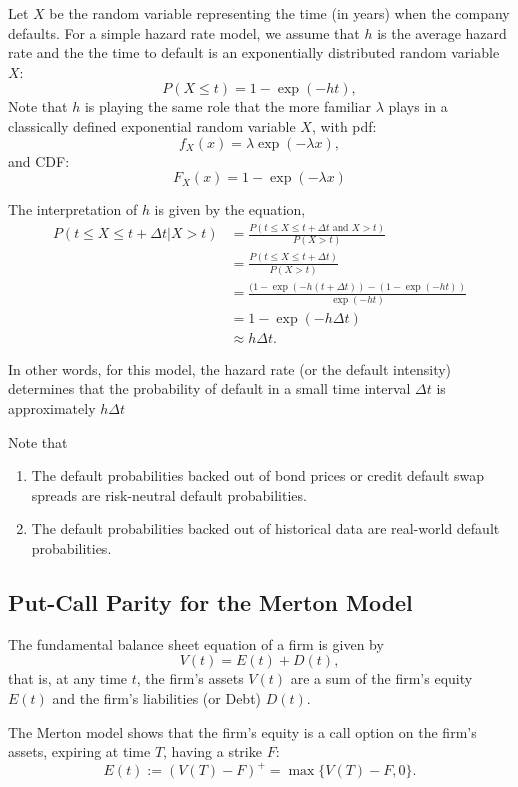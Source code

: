 \documentclass{amsart}
\theoremstyle{plain}
\numberwithin{equation}{section}
\begin{document}
Let $X$ be the random variable representing the time (in years)
when the company defaults. For a simple hazard rate model, 
we assume that $h$ is the average hazard rate and the 
the time to default is an exponentially distributed 
random variable $X$:
$$P( X \leq t ) = 1 - \exp( -h t ),$$
Note that $h$ is playing the same role that 
the more familiar $\lambda$ plays in a classically
defined exponential random variable $X$, with pdf:
$$f_X(x) = \lambda \exp(-\lambda x),$$
and CDF:
$$F_X(x) = 1-\exp(-\lambda x)$$

The interpretation of $h$ is given by the equation,
\begin{align*}
P( t \leq X \leq t + \Delta t | X > t ) &=\frac{P( t \leq X \leq t + \Delta t \mbox{ and } X > t )}{P(X >t)}\\
&= \frac{P( t \leq X \leq t + \Delta t)}{P(X >t)}\\
&= \frac{(1-\exp(-h(t+\Delta t))-(1-\exp(-ht))}{\exp(-ht)}\\
&= 1 - \exp(-h\Delta t)\\
& \approx h \Delta t.
\end{align*}

In other words, for this model, the hazard rate (or the default intensity) determines that the probability of 
default in a small time interval $\Delta t$ is approximately 
$h \Delta t$

Note that 
\begin{enumerate}
	\item The default probabilities backed out of bond prices or credit default 
	swap spreads are risk-neutral default probabilities.
	\item The default probabilities backed out of historical data are 
	real-world default probabilities.
\end{enumerate}

\subsection{Put-Call Parity for the Merton Model}
The fundamental balance sheet equation of a firm
is given by
$$V(t) = E(t) + D(t),$$
that is, at any time $t$, the firm's assets $V(t)$ are 
a sum of the firm's equity $E(t)$ and the firm's 
liabilities (or Debt)  $D(t)$.

The Merton model shows that the firm's equity is 
a call option on the firm's assets, expiring at 
time $T$, having a strike $F$:
$$E(t)  := \left(V(T) - F\right)^{+}= \max\{V(T)-F,0\}.$$
\end{document}
